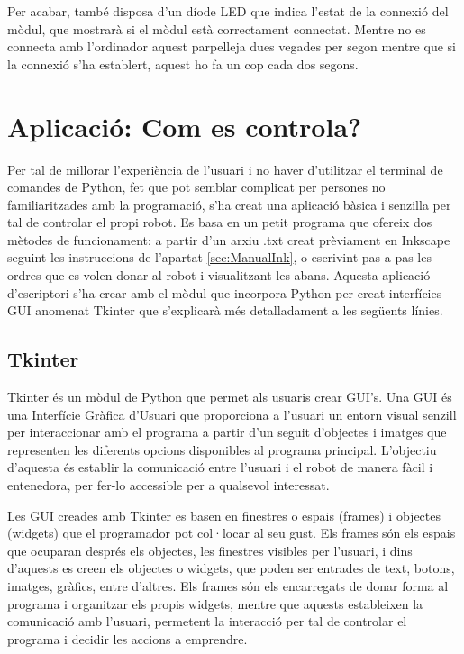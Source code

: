 Per acabar, també disposa d’un díode LED que indica l’estat de la connexió del mòdul, que mostrarà si el mòdul està correctament connectat. Mentre no es connecta amb l’ordinador aquest parpelleja dues vegades per segon mentre que si la connexió s’ha establert,  aquest ho fa un cop cada dos segons. 


\section{Aplicació: Com es controla?}

Per tal de millorar l’experiència de l’usuari i no haver d’utilitzar el terminal de comandes de Python, fet que pot semblar complicat per persones no familiaritzades amb la programació, s’ha creat una aplicació bàsica i senzilla per tal de controlar el propi robot. Es basa en un petit programa que ofereix dos mètodes de funcionament: a partir d’un arxiu .txt creat prèviament en Inkscape seguint les instruccions de l’apartat \ref{sec:ManualInk}, o escrivint pas a pas les ordres que es volen donar al robot i visualitzant-les abans.
Aquesta aplicació d’escriptori s’ha crear amb el mòdul que incorpora Python per creat interfícies GUI anomenat Tkinter que s’explicarà més detalladament a les següents línies. 

\subsection{Tkinter}
Tkinter és un mòdul de Python que permet als usuaris crear GUI’s. Una GUI és una Interfície Gràfica d’Usuari que proporciona a l’usuari un entorn visual senzill per interaccionar amb el programa a partir d’un seguit d’objectes i imatges que representen les diferents opcions disponibles al programa principal. L’objectiu d’aquesta és establir la comunicació entre l’usuari i el robot de manera fàcil i entenedora, per fer-lo accessible per a qualsevol interessat. 

Les GUI creades amb Tkinter es basen en finestres o espais (frames) i objectes (widgets) que el programador pot col·locar al seu gust. Els frames són els espais que ocuparan després els objectes, les finestres visibles per l’usuari, i dins d’aquests es creen els objectes o widgets, que poden ser entrades de text, botons, imatges, gràfics, entre d’altres. Els frames són els encarregats de donar forma al programa i organitzar els propis widgets, mentre que aquests estableixen la comunicació amb l’usuari, permetent la interacció per tal de controlar el programa i decidir les accions a emprendre. 

